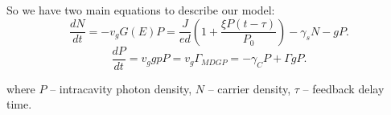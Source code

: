 So we have two main equations to describe our model:
\begin{equation}
	\frac{d N}{d t} = - v_g G(E) P =  \frac{J}{ed} \left(
	1 + \frac{\xi P (t- \tau)}{P_0}
\right) - \gamma_s N - g P.
\end{equation}
\begin{equation}
	\frac{d P}{d t} = v_g g pP = v_g \Gamma_{MD G P} = - \gamma_C P + \Gamma g P.
\end{equation}

where $P$ -- intracavity photon density, $N$ -- carrier density, $\tau$ -- feedback delay time.